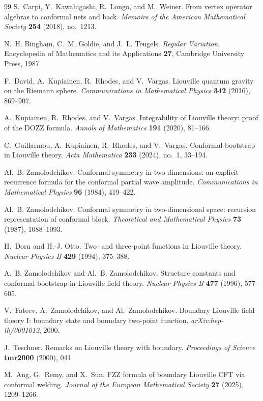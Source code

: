 \begin{thebibliography}{99}
S.~Carpi, Y.~Kawahigashi, R.~Longo, and M.~Weiner.
From vertex operator algebras to conformal nets and back.
\emph{Memoirs of the American Mathematical Society} \textbf{254} (2018),
no.~1213.

N.~H. Bingham, C.~M. Goldie, and J.~L. Teugels.
\emph{Regular Variation}.
Encyclopedia of Mathematics and its Applications \textbf{27},
Cambridge University Press, 1987.

F.~David, A.~Kupiainen, R.~Rhodes, and V.~Vargas.
Liouville quantum gravity on the Riemann sphere.
\emph{Communications in Mathematical Physics} \textbf{342} (2016),
869--907.

A.~Kupiainen, R.~Rhodes, and V.~Vargas.
Integrability of Liouville theory: proof of the DOZZ formula.
\emph{Annals of Mathematics} \textbf{191} (2020), 81--166.

C.~Guillarmou, A.~Kupiainen, R.~Rhodes, and V.~Vargas.
Conformal bootstrap in Liouville theory.
\emph{Acta Mathematica} \textbf{233} (2024), no.~1, 33--194.

Al.~B. Zamolodchikov.
Conformal symmetry in two dimensions: an explicit recurrence formula for the
conformal partial wave amplitude.
\emph{Communications in Mathematical Physics} \textbf{96} (1984), 419--422.

Al.~B. Zamolodchikov.
Conformal symmetry in two-dimensional space: recursion representation of
conformal block.
\emph{Theoretical and Mathematical Physics} \textbf{73} (1987), 1088--1093.

H.~Dorn and H.-J. Otto.
Two- and three-point functions in Liouville theory.
\emph{Nuclear Physics B} \textbf{429} (1994), 375--388.

A.~B. Zamolodchikov and Al.~B. Zamolodchikov.
Structure constants and conformal bootstrap in Liouville field theory.
\emph{Nuclear Physics B} \textbf{477} (1996), 577--605.

V.~Fateev, A.~Zamolodchikov, and Al.~Zamolodchikov.
Boundary Liouville field theory I: boundary state and boundary two-point
function.
\emph{arXiv:hep-th/0001012}, 2000.

J.~Teschner.
Remarks on Liouville theory with boundary.
\emph{Proceedings of Science} \textbf{tmr2000} (2000), 041.

M.~Ang, G.~Remy, and X.~Sun.
FZZ formula of boundary Liouville CFT via conformal welding.
\emph{Journal of the European Mathematical Society} \textbf{27} (2025),
1209--1266.


\end{thebibliography}
